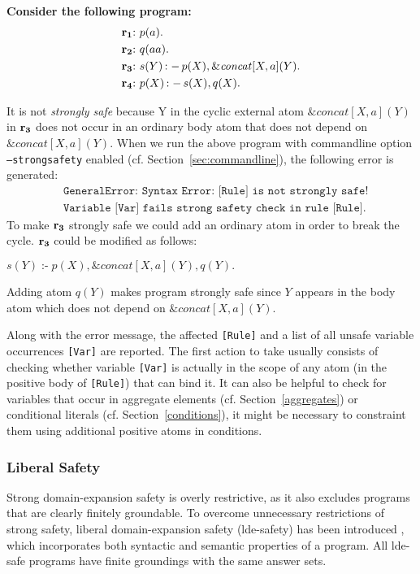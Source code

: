 \documentclass[a4paper, titlepage]{article}
\newcommand{\ext}[3]{\ensuremath{\&{\mathit{#1}}[#2](#3)}}
\DeclareMathOperator{\leftimpl}{:-}
\newcommand\mycenterline[1]{\par\smallskip\centerline{#1} \smallskip}
\newcommand{\row}[1]{%
  \ensuremath{\color{black}\ensuremath{\mathbf{#1}} \color{black}}%
}
\newcommand{\rowprefix}[1]{%
  \ensuremath{\color{black}\mathbf{#1{:}}\ }%
}
\begin{document}
\begin{exmp} \textbf{Consider the following program:}
\label{strongSafetyExmp}
\begin{align*}
& \rowprefix{r_1} p(a). \\
& \rowprefix{r_2} q(aa). \\
& \rowprefix{r_3} s(Y) \leftimpl p(X), \ext{concat}{X,a}{Y}. \\
& \rowprefix{r_4} p(X) \leftimpl s(X), q(X).
\end{align*}
\end{exmp}
It is not \emph{strongly safe} because Y in the cyclic external atom $\ext{concat}{X,a}{Y}$ in $\row{r_3}$ does not occur in an
ordinary body atom that does not depend on $\ext{concat}{X,a}{Y}$.
When we run the above program with commandline option 
\texttt{--strongsafety} enabled
(cf. Section~\ref{sec:commandline}),
the following error is generated:
\begin{align*}
& \texttt{GeneralError:~Syntax Error:~[Rule] is not strongly safe!}  \\
& \texttt{Variable [Var] fails strong safety check in rule [Rule].}
\end{align*}
To make $\row{r_3}$ strongly safe we could add an ordinary atom in order to break the cycle. $\row{r_3}$ could be modified as follows:\mycenterline{$s(Y) \leftimpl p(X), \ext{concat}{X,a}{Y},q(Y).$} Adding atom $q(Y)$ makes program strongly safe since $Y$ appears in the body atom which does not depend on $\ext{concat}{X,a}{Y}$.
 
Along with the error message, the affected \texttt{[Rule]} and a list of all unsafe variable occurrences \texttt{[Var]} are reported. 
The first action to take usually consists of checking whether variable \texttt{[Var]} is actually in the scope of any atom (in the positive body of \texttt{[Rule]}) that can bind it. It can also be helpful to check for variables that occur in aggregate elements (cf. Section~\ref{aggregates}) or conditional literals (cf. Section~\ref{conditions}),
it might be necessary to constraint them
using additional positive atoms in conditions. 


\subsubsection{Liberal Safety}
Strong domain-expansion safety is overly restrictive, as it also excludes programs that are clearly finitely groundable.
To overcome unnecessary restrictions of strong safety, liberal domain-expansion safety (lde-safety)
has been introduced \cite{eite-etal-14a}, which incorporates both syntactic and semantic properties of a program. All lde-safe programs have finite groundings with the same answer sets.
\end{document}
